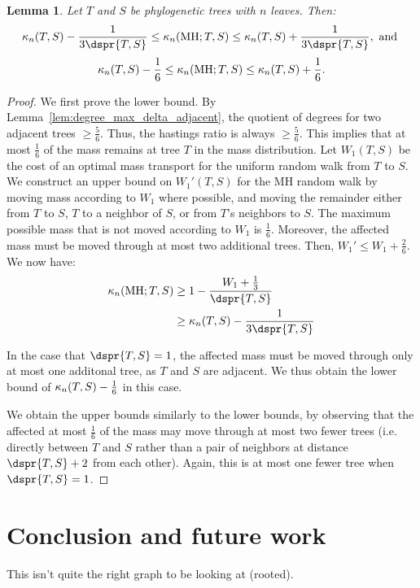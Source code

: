 \documentclass[11pt,onecolumn,conference]{IEEEtran}
\newtheorem{lemma}[theorem]{Lemma}
\newcommand{\MH}{\operatorname{MH}}
\newcommand{\curvature}[2][]{%
    \ifthenelse{\equal{#1}{}}%
		{\kappa_n(#2)}%
		{\kappa_n(#1;#2)}%
}
\begin{document}
\begin{lemma}
	Let $T$ and $S$ be phylogenetic trees with $n$ leaves. Then:
	$$\curvature{T,S} - \frac{1}{3\dspr{T,S}}
	\le \curvature[\MH]{T,S}
	\le \curvature{T,S} + \frac{1}{3\dspr{T,S}}, \text{ and }$$
	$$\curvature{T,S} - \frac{1}{6}
	\le \curvature[\MH]{T,S}
	\le \curvature{T,S} + \frac{1}{6}.$$
\end{lemma}
\begin{proof}
	We first prove the lower bound.
	By Lemma~\ref{lem:degree_max_delta_adjacent}, the quotient of degrees for two adjacent trees $\ge \frac{5}{6}$.
	Thus, the hastings ratio is always $\ge \frac{5}{6}$.
	This implies that at most $\frac{1}{6}$ of the mass remains at tree $T$ in the mass distribution.
	Let $W_1(T,S)$ be the cost of an optimal mass transport for the uniform random walk from $T$ to $S$.
	We construct an upper bound on $W_1'(T,S)$ for the MH random walk by moving mass according to $W_1$ where possible, and moving the remainder either from $T$ to $S$, $T$ to a neighbor of $S$, or from $T$'s neighbors to $S$.
	The maximum possible mass that is not moved according to $W_1$ is $\frac{1}{6}$.
	Moreover, the affected mass must be moved through at most two additional trees.
	Then, $W_1' \le W_1 + \frac{2}{6}$.
	We now have:
	\begin{align*}
		\curvature[\MH]{T,S} & \ge 1 - \frac{W_1 + \frac{1}{3}}{\dspr{T,S}} \\
		& \ge \curvature{T,S} - \frac{1}{3\dspr{T,S}}
	\end{align*}

	In the case that $\dspr{T,S}=1$, the affected mass must be moved through only at most one additonal tree, as $T$ and $S$ are adjacent.
	We thus obtain the lower bound of $\curvature{T,S} - \frac{1}{6}$ in this case.

	We obtain the upper bounds similarly to the lower bounds, by observing that the affected at most $\frac{1}{6}$ of the mass may move through at most two fewer trees (i.e. directly between $T$ and $S$ rather than a pair of neighbors at distance $\dspr{T,S} + 2$ from each other).
	Again, this is at most one fewer tree when $\dspr{T,S}=1$.

\end{proof}





\section{Conclusion and future work}
This isn't quite the right graph to be looking at (rooted).
\end{document}
